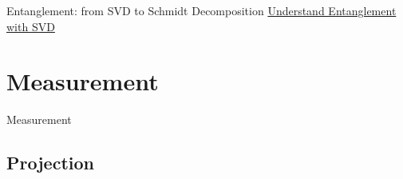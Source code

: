 \documentclass{beamer}
\begin{document}
\begin{frame}{Entanglement: from SVD to Schmidt Decomposition\tiny\cite{understandingentanglementwithsvd}}
  \href{https://www.math3ma.com/blog/understanding-entanglement-with-svd}{Understand Entanglement with SVD}
\end{frame}

\section{Measurement}
\begin{frame}
  Measurement
\end{frame}


\subsection{Projection}
\end{document}
